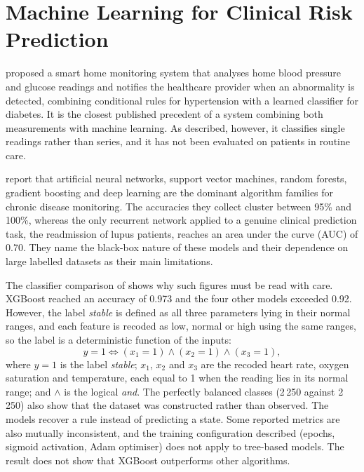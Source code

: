 \documentclass[11pt,a4paper,oneside]{report}
\begin{document}
\section{Machine Learning for Clinical Risk Prediction}\label{sec:lr-ml}

\Textcite{chatrati2022} proposed a smart home monitoring system that analyses home blood pressure and glucose readings and notifies the healthcare provider when an abnormality is detected, combining conditional rules for hypertension with a learned classifier for diabetes. It is the closest published precedent of a system combining both measurements with machine learning. As described, however, it classifies single readings rather than series, and it has not been evaluated on patients in routine care.

\Textcite{liu2025review} report that artificial neural networks, support vector machines, random forests, gradient boosting and deep learning are the dominant algorithm families for chronic disease monitoring. The accuracies they collect cluster between 95\% and 100\%, whereas the only recurrent network applied to a genuine clinical prediction task, the readmission of lupus patients, reaches an area under the curve (AUC) of 0.70. They name the black-box nature of these models and their dependence on large labelled datasets as their main limitations.

The classifier comparison of \textcite{efendi2025} shows why such figures must be read with care. XGBoost reached an accuracy of 0.973 and the four other models exceeded 0.92. However, the label \emph{stable} is defined as all three parameters lying in their normal ranges, and each feature is recoded as low, normal or high using the same ranges, so the label is a deterministic function of the inputs:
\begin{equation}
  y = 1 \iff (x_1 = 1) \wedge (x_2 = 1) \wedge (x_3 = 1),
\end{equation}
where $y = 1$ is the label \emph{stable}; $x_1$, $x_2$ and $x_3$ are the recoded heart rate, oxygen saturation and temperature, each equal to 1 when the reading lies in its normal range; and $\wedge$ is the logical \emph{and}. The perfectly balanced classes (2\,250 against 2\,250) also show that the dataset was constructed rather than observed. The models recover a rule instead of predicting a state. Some reported metrics are also mutually inconsistent, and the training configuration described (epochs, sigmoid activation, Adam optimiser) does not apply to tree-based models. The result does not show that XGBoost outperforms other algorithms.
\end{document}
